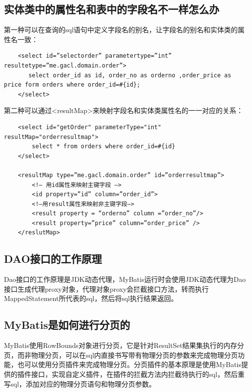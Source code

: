 \documentclass[main.tex]{subfiles}
\begin{document}
\subsection{实体类中的属性名和表中的字段名不一样怎么办}
第一种可以在查询的sql语句中定义字段名的别名，让字段名的别名和实体类的属性名一致：
\begin{verbatim}
    <select id=”selectorder” parametertype=”int” resultetype=”me.gacl.domain.order”>
       select order_id as id, order_no as orderno ,order_price as price form orders where order_id=#{id};
    </select>
\end{verbatim}
第二种可以通过<resultMap>来映射字段名和实体类属性名的一一对应的关系：
\begin{verbatim}
    <select id="getOrder" parameterType="int" resultMap="orderresultmap">
        select * from orders where order_id=#{id}
    </select>

    <resultMap type=”me.gacl.domain.order” id=”orderresultmap”>
        <!– 用id属性来映射主键字段 –>
        <id property=”id” column=”order_id”>
        <!–用result属性来映射非主键字段–>
        <result property = “orderno” column =”order_no”/>
        <result property=”price” column=”order_price” />
    </reslutMap>
\end{verbatim}

\subsection{DAO接口的工作原理}
Dao接口的工作原理是JDK动态代理，MyBatis运行时会使用JDK动态代理为Dao接口生成代理proxy对象，代理对象proxy会拦截接口方法，转而执行MappedStatement所代表的sql，然后将sql执行结果返回。

\subsection{MyBatis是如何进行分页的}
MyBatis使用RowBounds对象进行分页，它是针对ResultSet结果集执行的内存分页，而非物理分页，可以在sql内直接书写带有物理分页的参数来完成物理分页功能，也可以使用分页插件来完成物理分页。分页插件的基本原理是使用MyBatis提供的插件接口，实现自定义插件，在插件的拦截方法内拦截待执行的sql，然后重写sql，添加对应的物理分页语句和物理分页参数。
\end{document}
